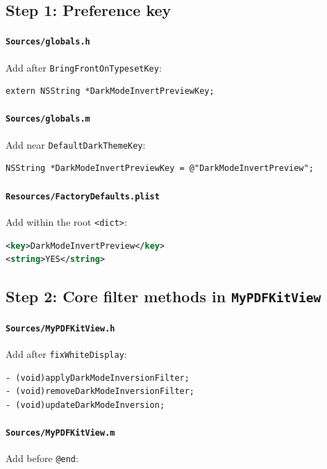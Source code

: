 \documentclass[11pt,a4paper]{article}
\begin{document}
\subsection{Step 1: Preference key}

\paragraph{\texttt{Sources/globals.h}} Add after
\texttt{BringFrontOnTypesetKey}:

\begin{lstlisting}
extern NSString *DarkModeInvertPreviewKey;
\end{lstlisting}

\paragraph{\texttt{Sources/globals.m}} Add near
\texttt{DefaultDarkThemeKey}:

\begin{lstlisting}
NSString *DarkModeInvertPreviewKey = @"DarkModeInvertPreview";
\end{lstlisting}

\paragraph{\texttt{Resources/FactoryDefaults.plist}} Add within the root
\texttt{<dict>}:

\begin{lstlisting}[language=XML]
<key>DarkModeInvertPreview</key>
<string>YES</string>
\end{lstlisting}

\subsection{Step 2: Core filter methods in \texttt{MyPDFKitView}}

\paragraph{\texttt{Sources/MyPDFKitView.h}} Add after
\texttt{fixWhiteDisplay}:

\begin{lstlisting}
- (void)applyDarkModeInversionFilter;
- (void)removeDarkModeInversionFilter;
- (void)updateDarkModeInversion;
\end{lstlisting}

\paragraph{\texttt{Sources/MyPDFKitView.m}} Add before \texttt{@end}:
\end{document}
